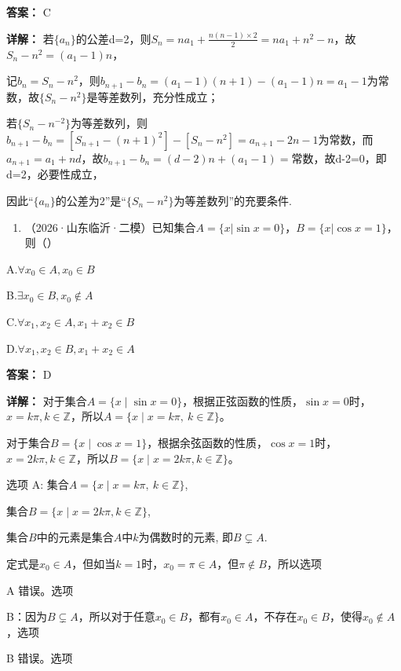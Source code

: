 \documentclass[11pt,a4paper]{ctexart}
\begin{document}
\textbf{答案：}
C

\textbf{详解：}
若\(\{a_{n}\}\)的公差d=2，则\(S_{n}=na_{1}+\frac{n(n-1)\times2}{2}=na_{1}+n^{2}-n\)，故\(S_{n}-n^{2}=(a_{1}-1)n\)，

记\(b_{n}=S_{n}-n^{2}\)，则\(b_{n+1}-b_{n}=(a_{1}-1)(n+1)-(a_{1}-1)n=a_{1}-1\)为常数，故\(\{S_{n}-n^{2}\}\)是等差数列，充分性成立；

若\(\{S_{n}-n^{-2}\}\)为等差数列，则\(b_{n+1}-b_{n}=[S_{n+1}-(n+1)^{2}]-[S_{n}-n^{2}]=a_{n+1}-2n-1\)为常数，而\(a_{n+1}=a_{1}+nd\)，故\(b_{n+1}-b_{n}=(d-2)n+(a_{1}-1)=\)常数，故d-2=0，即d=2，必要性成立，

因此``\(\{a_{n}\}\)的公差为2''是``\(\{S_{n}-n^{2}\}\)为等差数列''的充要条件.

\begin{enumerate}[label=\arabic*., leftmargin=*, start=16]
\item （2026·山东临沂·二模）已知集合\(A = \{x|\sin x = 0\}\)，\(B = \{x|\cos x = 1\}\)，则（）
\end{enumerate}

A.\(\forall x_{0}\in A,x_{0}\in B\)

B.\(\exists x_0\in B,x_0\notin A\)

C.\(\forall x_{1}, x_{2} \in A, x_{1} + x_{2} \in B\)

D.\(\forall x_{1}, x_{2} \in B, x_{1} + x_{2} \in A\)

\textbf{答案：}
D

\textbf{详解：}
对于集合\(A = \{x \mid \sin x = 0\}\)，根据正弦函数的性质，\(\sin x = 0\)时，\(x = k\pi, k \in \mathbb{Z}\)，所以\(A=\{x\mid x=k\pi,\ k\in\mathbb Z\}\)。

对于集合\(B=\{x\mid\cos x=1\}\)，根据余弦函数的性质，\(\cos x = 1\)时，\(x = 2k\pi, k \in \mathbb{Z}\)，所以\(B = \{x \mid x = 2k\pi, k \in \mathbb{Z}\}\)。

选项 A: 集合\(A=\{x\mid x=k\pi,\ k\in\mathbb Z\}\),

集合\(B = \{x \mid x = 2k\pi, k \in \mathbb{Z}\}\),

集合\(B\)中的元素是集合\(A\)中\(k\)为偶数时的元素, 即\(B \subsetneq A\).

定式是\(x_{0} \in A\)，但如当\(k = 1\)时，\(x_{0} = \pi \in A\)，但\(\pi \notin B\)，所以选项

A 错误。选项

B：因为\(B \subsetneq A\)，所以对于任意\(x_{0} \in B\)，都有\(x_{0} \in A\)，不存在\(x_{0} \in B\)，使得\(x_{0} \notin A\)，选项

B 错误。选项
\end{document}
